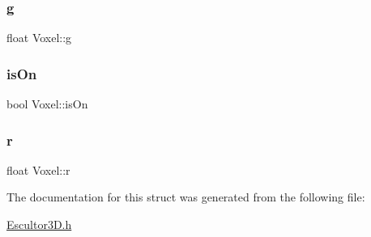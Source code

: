 \subsubsection{\texorpdfstring{g}{g}}
{\footnotesize\ttfamily float Voxel\+::g}

\mbox{\label{struct_voxel_a6fbe8bd53f64685ac4210726d40fc775}} 
\subsubsection{\texorpdfstring{isOn}{isOn}}
{\footnotesize\ttfamily bool Voxel\+::is\+On}

\mbox{\label{struct_voxel_a06872ec79b836120b551a848968c0f1b}} 
\subsubsection{\texorpdfstring{r}{r}}
{\footnotesize\ttfamily float Voxel\+::r}



The documentation for this struct was generated from the following file\+:\begin{DoxyCompactItemize}
\item 
\mbox{\hyperlink{_escultor3_d_8h}{Escultor3\+D.\+h}}\end{DoxyCompactItemize}

